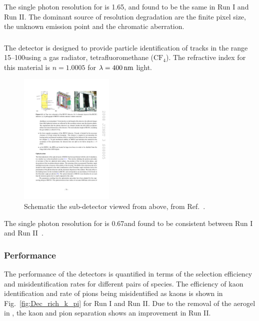 The single photon resolution for \richone is 1.65\mrad, and found to be the same in Run I and Run II. The dominant source of resolution degradation are the finite pixel size, the unknown emission point and the chromatic aberration.  


\subsubsection{\richtwo}

The \richtwo detector is designed to provide particle identification of tracks in the range 15--100\gevc using a gas radiator, tetrafluoromethane ($\text{C}\text{F}_{4}$). The refractive index for this material is $n=1.0005$ for $\lambda = 400\mathrm{ \,nm}$ light.

\begin{figure}[!h]
    \centering        
    \includegraphics[width=0.4\textwidth]{figs/Detector/richtwo_layout.pdf}
    \caption{Schematic the \richtwo sub-detector viewed from above, from Ref.~\cite{Alves:2008zz}.}
    \label{fig:Dec_richtwo_layout}   
\end{figure}
The single photon resolution for \richtwo is 0.67\mrad and found to be consistent between Run I and Run II~\cite{PAPANESTIS2017221}.


\subsubsection{Performance}
The performance of the \rich detectors is quantified in terms of the selection efficiency and misidentification rates for different pairs of species. The efficiency of kaon identification and rate of pions being misidentified as kaons is shown in Fig.~\ref{fig:Dec_rich_k_pi} for Run I and Run II. Due to the removal of the aerogel in \richone, the kaon and pion separation shows an improvement in Run II.

